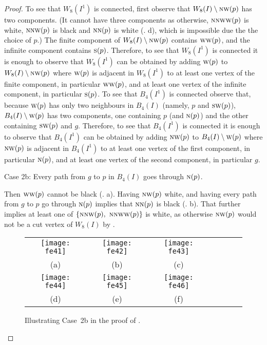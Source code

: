 \documentclass[lotsofwhite,charterfonts]{patmorin}
\newcommand{\N}{\textsc{n}}
\renewcommand{\S}{\textsc{s}}
\newcommand{\SW}{\textsc{sw}}
\newcommand{\W}{\textsc{w}}
\newcommand{\NW}{\textsc{nw}}
\newcommand{\sm}{\ensuremath{\setminus}}
\begin{document}
\begin{proof}
To see that $W_8(I^1)$ is connected, first observe that $W_8(I)\sm \NW(p)$ has two components. (It cannot have three components as otherwise,  $\N\N\W\W(p)$ is white, $\N\N\W(p)$ is black and  $\N\N(p)$ is white (. d), which  is impossible due the the choice of $p$.) The finite component of $W_8(I)\sm \NW(p)$ contains $\W\W(p)$, and the infinite component contains $\S(p)$. Therefore, to see that $W_8(I^1)$ is connected it is enough to observe that $W_8(I^1)$ can be obtained by adding $\W(p)$ to $W_8(I)\sm \NW(p)$ where $\W(p)$ is adjacent in $W_8(I^1)$ to at least one vertex of the finite component, in particular $\W\W(p)$, and at least one vertex of the infinite component, in particular $\S(p)$. To see that $B_4(I^1)$ is connected observe that, because $\W(p)$ has only two neighbours in $B_4(I)$ (namely, $p$ and $\SW(p)$), $B_4(I)\sm \W(p)$ has two components, one containing $p$ (and $\N(p)$) and the other containing $\SW(p)$ and $g$. Therefore, to see that $B_4(I^1)$ is connected it is enough to observe that $B_4(I^1)$ can be obtained by adding $\NW(p)$ to $B_4(I)\sm \W(p)$ where $\NW(p)$ is adjacent in $B_4(I^1)$ to at least one vertex of the first component, in particular $\N(p)$, and at least one vertex of the second component, in particular $g$. 


\noindent Case 2b: Every path from $g$ to $p$ in $B_4(I)$ goes through $\N(p)$. 

Then $\W\W(p)$ cannot be black (. a). Having $\NW(p)$ white, and having every path from $g$ to $p$ go through $\N(p)$ implies that $\N\N(p)$ is black (. b). That further implies  at least one of $\{\N\NW(p),\ \N\NW\W(p)\}$ is white, as otherwise $\NW(p)$ would not be a cut vertex of $W_8(I)$ by . 

\begin{figure}[htbp]
\begin{center}
\begin{tabular}{ccccccc}
\texttt{[image: fe41]} &
\texttt{[image: fe42]} &
\texttt{[image: fe43]} \\
(a) & (b) & (c) \\ 
\texttt{[image: fe44]} &
\texttt{[image: fe45]} &
\texttt{[image: fe46]} \\
(d) & (e) & (f)
\end{tabular}
\end{center}
\caption{Illustrating Case~2b in the proof of .}
\end{figure}


\end{proof}
\end{document}
